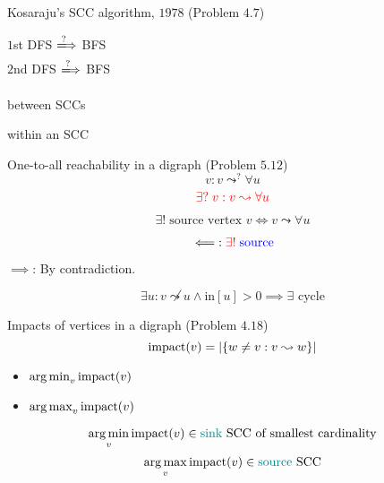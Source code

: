 \begin{frame}{}
  \begin{exampleblock}{Kosaraju's SCC algorithm, $1978$ (Problem $4.7$)}
    \begin{center}
      $1$st DFS $\xLongrightarrow{?}$ BFS \\[8pt]
      $2$nd DFS $\xLongrightarrow{?}$ BFS
    \end{center}
  \end{exampleblock}

  \pause
  \vspace{0.50cm}
  \begin{description}
    \centering
    \item[$1$st DFS:]  between SCCs
    \item[$2$nd DFS:]  within an SCC
  \end{description}

  \pause
  \vspace{0.50cm}
  \centerline{}
\end{frame}
\begin{frame}{}
  \begin{exampleblock}{One-to-all reachability in a digraph (Problem $5.12$)}
    \[
      v: v \leadsto^{?} \forall u
    \]
    \[
      \textcolor{red}{\exists?\; v: v \leadsto \forall u}
    \]
  \end{exampleblock}

  \pause
  \vspace{0.60cm}
  \centerline{}

  \[
    \exists!\; \text{source vertex } v \iff v \leadsto \forall u
  \]

  \pause
  \[
    \impliedby: \textcolor{red}{\exists!}\; \textcolor{blue}{\text{source}}
  \]

  \pause
  \centerline{$\implies$: By contradiction.}
  \[
    \exists u: v \not\leadsto u \land \text{in}[u] > 0 \implies \exists \text{ cycle}
  \]
\end{frame}
\begin{frame}{}
  \begin{exampleblock}{Impacts of vertices in a digraph (Problem $4.18$)}
    \[
      \text{impact}(v) = |\{w \neq v: v \leadsto w\}|
    \]

    \begin{itemize}
      \centering
      \item $\operatorname*{arg\,min}_{v} \text{impact}(v)$
      \item $\operatorname*{arg\,max}_{v} \text{impact}(v)$
    \end{itemize}
  \end{exampleblock}

  \pause
  \[
    \operatorname*{arg\,min}_{v} \text{impact}(v) \in \text{\textcolor{teal}{sink} SCC of smallest cardinality}
  \]
  \pause
  \[
    \operatorname*{arg\,max}_{v} \text{impact}(v) \in \text{\textcolor{teal}{source} SCC}
  \]

  \pause
  \vspace{0.30cm}
  \centerline{}
\end{frame}
